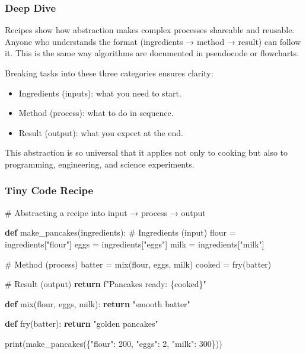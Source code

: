 \documentclass[
  letterpaper,
  DIV=11,
  numbers=noendperiod]{scrreprt}
\newenvironment{Shaded}{\begin{snugshade}}{\end{snugshade}}
\newcommand{\BuiltInTok}[1]{\textcolor[rgb]{0.00,0.23,0.31}{#1}}
\newcommand{\CommentTok}[1]{\textcolor[rgb]{0.37,0.37,0.37}{#1}}
\newcommand{\ControlFlowTok}[1]{\textcolor[rgb]{0.00,0.23,0.31}{\textbf{#1}}}
\newcommand{\DecValTok}[1]{\textcolor[rgb]{0.68,0.00,0.00}{#1}}
\newcommand{\KeywordTok}[1]{\textcolor[rgb]{0.00,0.23,0.31}{\textbf{#1}}}
\newcommand{\NormalTok}[1]{\textcolor[rgb]{0.00,0.23,0.31}{#1}}
\newcommand{\OperatorTok}[1]{\textcolor[rgb]{0.37,0.37,0.37}{#1}}
\newcommand{\SpecialCharTok}[1]{\textcolor[rgb]{0.37,0.37,0.37}{#1}}
\newcommand{\SpecialStringTok}[1]{\textcolor[rgb]{0.13,0.47,0.30}{#1}}
\newcommand{\StringTok}[1]{\textcolor[rgb]{0.13,0.47,0.30}{#1}}
\providecommand{\tightlist}{%
  \setlength{\itemsep}{0pt}\setlength{\parskip}{0pt}}
\begin{document}
\subsubsection{Deep Dive}\label{deep-dive-19}

Recipes show how abstraction makes complex processes shareable and
reusable. Anyone who understands the format (ingredients → method →
result) can follow it. This is the same way algorithms are documented in
pseudocode or flowcharts.

Breaking tasks into these three categories ensures clarity:

\begin{itemize}
\tightlist
\item
  Ingredients (inputs): what you need to start.
\item
  Method (process): what to do in sequence.
\item
  Result (output): what you expect at the end.
\end{itemize}

This abstraction is so universal that it applies not only to cooking but
also to programming, engineering, and science experiments.

\subsubsection{Tiny Code Recipe}\label{tiny-code-recipe-47}

\begin{Shaded}
\begin{Highlighting}[]
\CommentTok{\# Abstracting a recipe into input → process → output}

\KeywordTok{def}\NormalTok{ make\_pancakes(ingredients):}
    \CommentTok{\# Ingredients (input)}
\NormalTok{    flour }\OperatorTok{=}\NormalTok{ ingredients[}\StringTok{"flour"}\NormalTok{]}
\NormalTok{    eggs }\OperatorTok{=}\NormalTok{ ingredients[}\StringTok{"eggs"}\NormalTok{]}
\NormalTok{    milk }\OperatorTok{=}\NormalTok{ ingredients[}\StringTok{"milk"}\NormalTok{]}

    \CommentTok{\# Method (process)}
\NormalTok{    batter }\OperatorTok{=}\NormalTok{ mix(flour, eggs, milk)}
\NormalTok{    cooked }\OperatorTok{=}\NormalTok{ fry(batter)}

    \CommentTok{\# Result (output)}
    \ControlFlowTok{return} \SpecialStringTok{f"Pancakes ready: }\SpecialCharTok{\{}\NormalTok{cooked}\SpecialCharTok{\}}\SpecialStringTok{"}

\KeywordTok{def}\NormalTok{ mix(flour, eggs, milk): }
    \ControlFlowTok{return} \StringTok{"smooth batter"}

\KeywordTok{def}\NormalTok{ fry(batter): }
    \ControlFlowTok{return} \StringTok{"golden pancakes"}

\BuiltInTok{print}\NormalTok{(make\_pancakes(\{}\StringTok{"flour"}\NormalTok{: }\DecValTok{200}\NormalTok{, }\StringTok{"eggs"}\NormalTok{: }\DecValTok{2}\NormalTok{, }\StringTok{"milk"}\NormalTok{: }\DecValTok{300}\NormalTok{\}))}
\end{Highlighting}
\end{Shaded}
\end{document}
